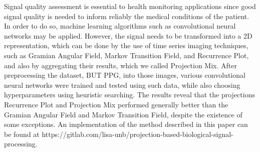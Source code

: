 Signal quality assessment is essential to health monitoring applications since good signal quality is needed to inform reliably the medical conditions of the patient. In order to do so, machine learning algorithms such as convolutional neural networks may be applied. However, the signal needs to be transformed into a 2D representation, which can be done by the use of time series imaging techniques, such as Gramian Angular Field, Markov Transition Field, and Recurrence Plot, and also by aggregating their results, which we called Projection Mix. After preprocessing the dataset, BUT PPG, into those images, various convolutional neural networks were trained and tested using such data, while also choosing hyperparameters using heuristic searching. The results reveal that the projections Recurrence Plot and Projection Mix performed generally better than the Gramian Angular Field and Markov Transition Field, despite the existence of some exceptions. An implementation of the method described in this paper can be found at {https://gitlab.com/lisa-unb/projection-based-biological-signal-processing}.

